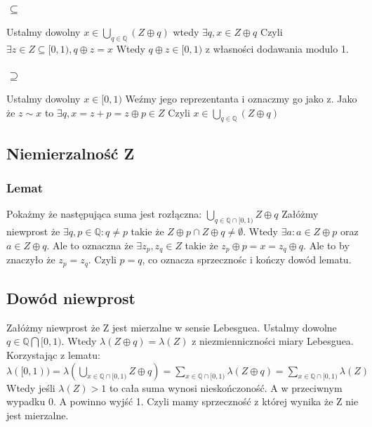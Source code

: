 \documentclass{article}
\begin{document}
\subsubsection*{$\subseteq$}
Ustalmy dowolny $x \in \bigcup_{q \in \mathbb{Q}} (Z \oplus q)$ wtedy $\exists q,x \in Z \oplus q$ Czyli $\exists z \in Z \subseteq [0, 1), q \oplus z = x$ Wtedy $q \oplus z \in [0, 1)$ z własności dodawania modulo 1.     
\subsubsection*{$\supseteq$}
Ustalmy dowolny $x \in [0, 1)$ Weźmy jego reprezentanta i oznaczmy go jako z. Jako że $z \sim x$ to $\exists q, x = z + p = z \oplus p \in Z$ Czyli $x \in \bigcup_{q \in \mathbb{Q}} (Z \oplus q)$

\subsection*{Niemierzalność Z}
\subsubsection*{Lemat}
Pokażmy że następująca suma jest rozłączna:
$\bigcup_{q\in \mathbb{Q} \cap [0,1)} Z \oplus q$
Załóżmy niewprost że $\exists q,p \in \mathbb{Q}: q \neq p$ takie że $Z \oplus p \cap Z \oplus q \neq \emptyset$. Wtedy $\exists a: a \in Z \oplus p$ oraz $a \in Z \oplus q$. Ale to oznaczna że $\exists z_p, z_q \in Z$ takie że $z_p \oplus p = x = z_q \oplus q$. Ale to by znaczyło że $z_p = z_q$. Czyli $p=q$, co oznacza sprzecznośc i kończy dowód lematu. 


\subsection*{Dowód niewprost}
Załóżmy niewprost że Z jest mierzalne w sensie Lebesguea. Ustalmy dowolne $q \in \mathbb{Q} \bigcap [0,1)$. Wtedy $\lambda (Z \oplus q) = \lambda(Z)$ z niezmienniczności miary Lebesguea. Korzystając z lematu:
$\lambda([0, 1)) = \lambda ( \bigcup_{x\in \mathbb{Q} \cap [0,1)} Z \oplus q ) = \sum_{x\in \mathbb{Q} \cap [0,1)} \lambda(Z \oplus q) = \sum_{x\in \mathbb{Q} \cap [0,1)} \lambda(Z)$ Wtedy jeśli $\lambda(Z) > 1$ to cała suma wynosi nieskończoność. A w przeciwnym wypadku 0. A powinno wyjść 1. Czyli mamy sprzeczność z której wynika że Z nie jest mierzalne.
\end{document}
